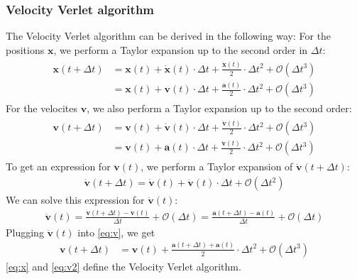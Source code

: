 \documentclass[a4paper,10pt,bibtotoc]{scrartcl}
\begin{document}
\subsubsection{Velocity Verlet algorithm}
The Velocity Verlet algorithm can be derived in the following way: For the positions $\mathbf{x}$, we perform a Taylor expansion up to the second order in $\Delta t$:
\begin{align}
\begin{split}
 \mathbf{x}(t + \Delta t) &= \mathbf{x}(t) + \dot{\mathbf{x}}(t)\cdot \Delta t + \frac{\ddot{\mathbf{x}}(t)}{2}\cdot \Delta t^2 + \mathcal{O}(\Delta t^3)\\
 &= \mathbf{x}(t) + \mathbf{v}(t)\cdot \Delta t + \frac{\mathbf{a}(t)}{2}\cdot \Delta t^2 + \mathcal{O}(\Delta t^3)
 \end{split}
 \label{eq:x}
\end{align}
For the velocites $\mathbf{v}$, we also perform a Taylor expansion up to the second order:
\begin{align}
\begin{split}
 \mathbf{v}(t + \Delta t) &= \mathbf{v}(t) + \dot{\mathbf{v}}(t)\cdot \Delta t + \frac{\ddot{\mathbf{v}}(t)}{2}\cdot \Delta t^2 + \mathcal{O}(\Delta t^3)\\
 &=\mathbf{v}(t) + \mathbf{a}(t)\cdot \Delta t + \frac{\ddot{\mathbf{v}}(t)}{2}\cdot \Delta t^2 + \mathcal{O}(\Delta t^3)
\end{split}
 \label{eq:v}
\end{align}
To get an expression for $\ddot{\mathbf{v}}(t)$, we perform a Taylor expansion of $\dot{\mathbf{v}}(t + \Delta t)$:
\begin{align}
 \dot{\mathbf{v}}(t + \Delta t) = \dot{\mathbf{v}}(t) + \ddot{\mathbf{v}}(t)\cdot \Delta t + \mathcal{O}(\Delta t^2)
\end{align}
We can solve this expression for $\ddot{\mathbf{v}}(t)$:
\begin{align}
 \ddot{\mathbf{v}}(t) = \frac{\dot{\mathbf{v}}(t+\Delta t) - \dot{\mathbf{v}}(t)}{\Delta t} + \mathcal{O}(\Delta t) = \frac{\mathbf{a}(t+\Delta t) - \mathbf{a}(t)}{\Delta t} + \mathcal{O}(\Delta t)
\end{align}
Plugging $\ddot{\mathbf{v}}(t)$ into \autoref{eq:v}, we get
\begin{align}
 \mathbf{v}(t + \Delta t) &=\mathbf{v}(t) + \frac{\mathbf{a}(t+\Delta t) + \mathbf{a}(t)}{2} \cdot\Delta t^2 + \mathcal{O}(\Delta t^3)
 \label{eq:v2}
\end{align}
\autoref{eq:x} and \autoref{eq:v2} define the Velocity Verlet algorithm.
\end{document}
